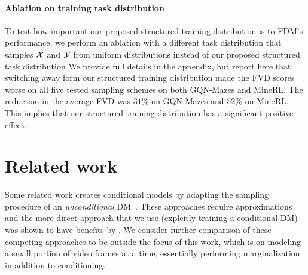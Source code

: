 \paragraph{Ablation on training task distribution}
To test how important our proposed structured training distribution is to FDM's performance, we perform an ablation with a different task distribution that samples $\mathcal{X}$ and $\mathcal{Y}$ from uniform distributions instead of our proposed structured task distribution
We provide full details in the appendix, but report here that switching away form our structured training distribution made the FVD scores worse on all five tested sampling schemes on both GQN-Mazes and MineRL. The reduction in the average FVD was $31\%$ on GQN-Mazes and $52\%$ on MineRL. This implies that our structured training distribution has a significant positive effect.

\section{Related work}
Some related work creates conditional models by adapting the sampling procedure of an \textit{unconditional} DM~\citep{song2020score,kadkhodaie2020solving,mittal2021symbolic,ho2022video}. These approaches require approximations and the more direct approach that we use (explcitly training a conditional DM) was shown to have benefits by \citet{tashiro2021csdi}. We consider further comparison of these competing approaches to be outside the focus of this work, which is on modeling a small portion of video frames at a time, essentially performing marginalization in addition to conditioning.


